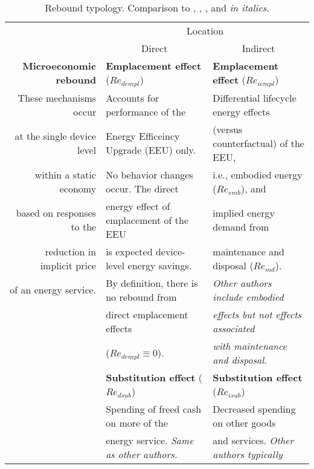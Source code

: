 \begin{table}
\footnotesize
\begin{center}
\caption{Rebound typology. Comparison to \citet{Sorrell:2009cg}, \citet{Jenkins2011}, 
                           \citet{Thomas:2013aa,Thomas:2013ab}, and \citet{Walnum2014} \emph{in italics}.}
\label{tab:rebound_typology}
\begin{tabular}{ r l l }
\toprule
                                   & \multicolumn{2}{c}{Location} \\ 
                                   & \multicolumn{1}{c}{Direct}                  & \multicolumn{1}{c}{Indirect} \\
                                   \cmidrule{2-3}
\textbf{Microeconomic rebound}     & \textbf{Emplacement effect} ($Re_{dempl}$)  & \textbf{Emplacement effect} ($Re_{iempl}$) \\
These mechanisms occur             & Accounts for performance of the             & Differential lifecycle energy effects \\
at the single device level         & Energy Efficeincy Upgrade (EEU) only.       & (versus counterfactual) of the EEU, \\
within a static economy            & No behavior changes occur. The direct       & i.e., embodied energy ($Re_{emb}$), and \\
based on responses to the          & energy effect of emplacement of the EEU     & implied energy demand from \\
reduction in implicit price        & is expected device-level energy savings.    & maintenance and disposal ($Re_{md}$). \\
of an energy service.              & By definition, there is no rebound from     & \emph{Other authors include embodied} \\
                                   & direct emplacement effects                  & \emph{effects but not effects associated} \\
                                   & ($Re_{dempl} \equiv 0$).                    & \emph{with maintenance and disposal}. \\
                                   \cmidrule{2-3}
                                   & \textbf{Substitution effect} ($Re_{dsub}$)  & \textbf{Substitution effect} ($Re_{isub}$) \\
                                   & Spending of freed cash on more of the       & Decreased spending on other goods  \\
                                   & energy service. \emph{Same as other authors.}  & and services. \emph{Other authors typically} \\

\end{tabular}
\end{center}
\end{table}

